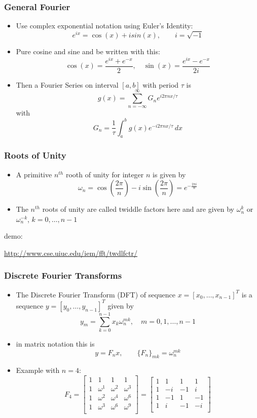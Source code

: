 \documentclass[10pt]{beamer}
\begin{document}
\begin{frame}
\frametitle{General Fourier}
\begin{itemize}
  \item Use complex exponential notation using Euler's Identity:
\[
  e^{i x} = \cos(x) + i sin(x),\qquad i = \sqrt{-1}
\]
  \item Pure cosine and sine and be written with this:
\[
  \cos(x) = \frac{e^{i x} + e^{-x}}{2},\quad \sin(x) = \frac{e^{i x} -
e^{-x}}{2i}
\]

  \item Then a Fourier Series on interval $[a,b]$ with period $\tau$ is
\[
  g(x) = \sum_{n=-\infty}^{\infty} G_n e^{i 2 \pi n x / \tau}
\]
with
\[
G_n = \frac{1}{\tau} \int_{a}^{b} g(x) e^{-i 2\pi n x / \tau}\, dx
\]
\end{itemize}
\end{frame}
\begin{frame}
\frametitle{Roots of Unity}
\begin{itemize}
  \item A primitive $n^{th}$ rooth of unity for integer $n$ is given by
\[
  \omega_n = \cos(\frac{2\pi}{n}) - i \sin(\frac{2\pi}{n}) = e^{-\frac{2\pi i}{n}}
\]
  
  \item The $n^{th}$ roots of unity are called twiddle factors here and are
given by $\omega_n^k$ or $\omega_n^{-k}$, $k=0,\dots,n-1$
\end{itemize}

demo: 
\bigskip

\url{http://www.cse.uiuc.edu/iem/fft/twdlfctr/}
\end{frame}

\begin{frame}
  \frametitle{Discrete Fourier Transforms}
  \begin{itemize}
  \item The Discrete Fourier Transform (DFT) of sequence $x =
[x_0,\dots,x_{n-1}]^T$ is a sequence $y = [y_0,\dots,y_{n-1}]^T$ given by
\[
y_m = \sum_{k=0}^{n-1} x_k \omega_n^{mk}, \quad m=0,1,\dots,n-1
\]
  \item in matrix notation this is
  \[
  y=F_n x,\qquad \{F_n\}_{mk} = \omega_n^{mk}
\]
  \item Example with $n=4$:
  \[
  F_4 = 
\begin{bmatrix}
1 & 1 & 1 & 1\\
1 & \omega^1 & \omega^2 & \omega^3\\
1 & \omega^2 & \omega^4 & \omega^6\\
1 & \omega^3 & \omega^6 & \omega^9\\
\end{bmatrix}
=
\begin{bmatrix}
1 & 1 & 1 & 1\\
1 & -i & -1 & i\\
1 & -1 & 1 & -1\\
1 & i & -1 & -i\\
\end{bmatrix}
\]
  \end{itemize}
\end{frame}
\end{document}
